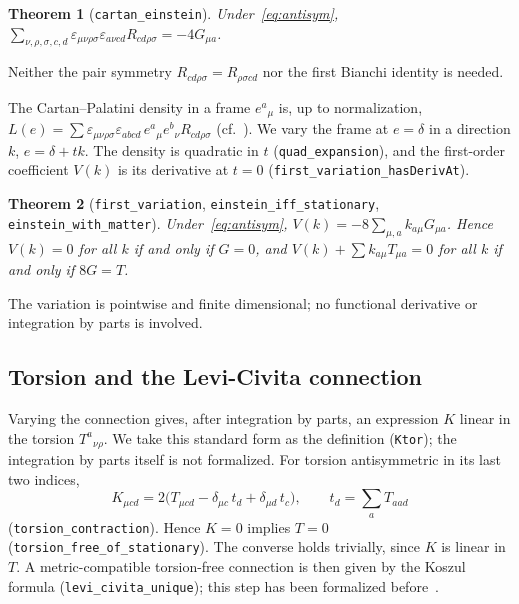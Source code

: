 \documentclass[11pt]{amsart}
\newtheorem{theorem}{Theorem}[section]
\theoremstyle{definition}
\theoremstyle{remark}
\newcommand{\lean}[1]{\texttt{#1}}
\begin{document}
\begin{theorem}[\lean{cartan\_einstein}]
Under~\eqref{eq:antisym}, $\sum_{\nu,\rho,\sigma,c,d}\varepsilon_{\mu\nu\rho\sigma}\varepsilon_{a\nu cd}R_{cd\rho\sigma}=-4G_{\mu a}$.
\end{theorem}
Neither the pair symmetry $R_{cd\rho\sigma}=R_{\rho\sigma cd}$ nor the first Bianchi identity is needed.

The Cartan--Palatini density in a frame $e^a{}_\mu$ is, up to normalization, $L(e)=\sum\varepsilon_{\mu\nu\rho\sigma}\varepsilon_{abcd}\,e^a{}_\mu e^b{}_\nu R_{cd\rho\sigma}$ (cf.~\cite{Peldan1994}). We vary the frame at $e=\delta$ in a direction $k$, $e=\delta+tk$. The density is quadratic in $t$ (\lean{quad\_expansion}), and the first-order coefficient $V(k)$ is its derivative at $t=0$ (\lean{first\_variation\_hasDerivAt}).

\begin{theorem}[\lean{first\_variation}, \lean{einstein\_iff\_stationary}, \lean{einstein\_with\_matter}]
Under~\eqref{eq:antisym}, $V(k)=-8\sum_{\mu,a}k_{a\mu}G_{\mu a}$. Hence $V(k)=0$ for all $k$ if and only if $G=0$, and $V(k)+\sum k_{a\mu}T_{\mu a}=0$ for all $k$ if and only if $8G=T$.
\end{theorem}
The variation is pointwise and finite dimensional; no functional derivative or integration by parts is involved.

\subsection{Torsion and the Levi-Civita connection}
Varying the connection gives, after integration by parts, an expression $K$ linear in the torsion $T^a{}_{\nu\rho}$. We take this standard form as the definition (\lean{Ktor}); the integration by parts itself is not formalized. For torsion antisymmetric in its last two indices,
\begin{equation}
K_{\mu cd}=2\big(T_{\mu cd}-\delta_{\mu c}\,t_d+\delta_{\mu d}\,t_c\big),\qquad t_d=\sum_a T_{aad}
\end{equation}
(\lean{torsion\_contraction}). Hence $K=0$ implies $T=0$ (\lean{torsion\_free\_of\_stationary}). The converse holds trivially, since $K$ is linear in $T$. A metric-compatible torsion-free connection is then given by the Koszul formula (\lean{levi\_civita\_unique}); this step has been formalized before~\cite{ChowLiaoQin2026}.
\end{document}
